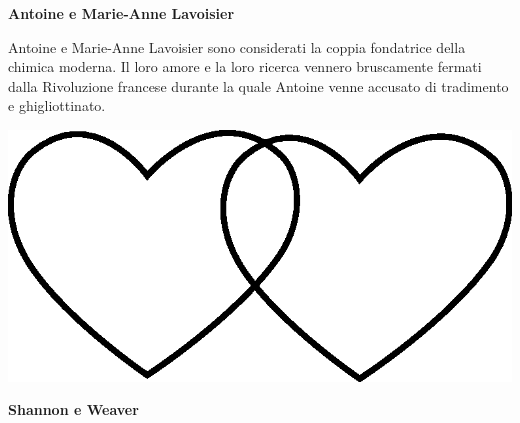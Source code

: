 \documentclass[11pt]{extarticle}
\begin{document}
\vspace*{\fill}
\newpage
\begin{center}
\vspace*{\fill}
{\Huge \textbf{Antoine e Marie-Anne Lavoisier\\}}
\vspace*{\fill}
\end{center}
\newpage
{}
\vspace*{\fill}
\begin{center}
Antoine e Marie-Anne Lavoisier sono considerati la coppia fondatrice della chimica moderna. Il loro amore e la loro ricerca vennero bruscamente fermati dalla Rivoluzione francese durante la quale Antoine venne accusato di tradimento e ghigliottinato.\\
\begin{center}
\includegraphics[scale=0.1]{img/cuori_venn.eps}\\
\end{center}
\end{center}
\vspace*{\fill}
\newpage
\begin{center}
\vspace*{\fill}
{\Huge \textbf{Shannon e Weaver\\}}
\vspace*{\fill}
\end{center}
\newpage
{}
\vspace*{\fill}
\end{document}
